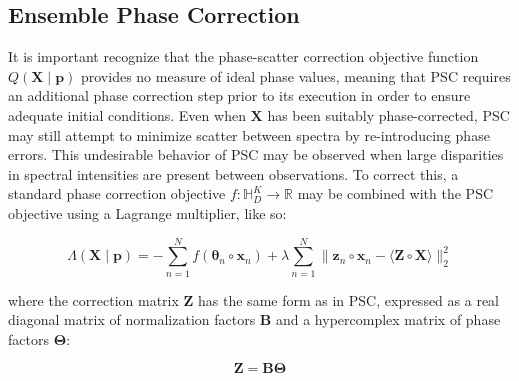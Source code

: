 \subsection{Ensemble Phase Correction}

\begin{doublespace}
It is important recognize that the phase-scatter correction objective function
$Q(\mathbf{X} \mid \mathbf{p})$ provides no measure of ideal phase values,
meaning that PSC requires an additional phase correction step prior to its
execution in order to ensure adequate initial conditions. Even when
$\mathbf{X}$ has been suitably phase-corrected, PSC may still attempt to
minimize scatter between spectra by re-introducing phase errors. This
undesirable behavior of PSC may be observed when large disparities in
spectral intensities are present between observations. To correct this,
a standard phase correction objective
$f : \mathbb{H}_D^{K} \to \mathbb{R}$ may be combined with
the PSC objective using a Lagrange multiplier, like so:

\begin{equation}
\Lambda(\mathbf{X} \mid \mathbf{p}) =
 -\sum_{n=1}^N f(\boldsymbol{\theta}_n \circ \mathbf{x}_n) +
 \lambda \sum_{n=1}^N \| \mathbf{z}_n \circ \mathbf{x}_n -
            \langle \mathbf{Z} \circ \mathbf{X} \rangle \|_2^2
\end{equation}

where the correction matrix $\mathbf{Z}$ has the same form as in PSC, expressed
as a real diagonal matrix of normalization factors $\mathbf{B}$ and a
hypercomplex matrix of phase factors $\mathbf{\Theta}$:

\begin{equation}
\mathbf{Z} = \mathbf{B} \mathbf{\Theta}
\end{equation}


\end{doublespace}
